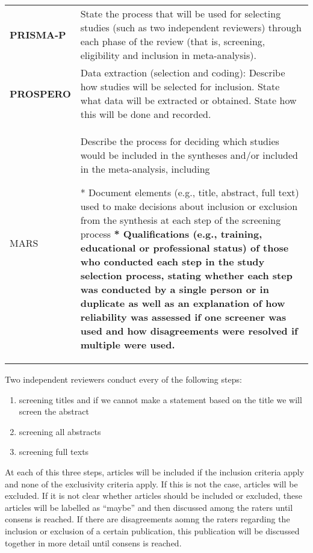 \documentclass[
]{article}
\providecommand{\tightlist}{%
  \setlength{\itemsep}{0pt}\setlength{\parskip}{0pt}}
\begin{document}
\hypertarget{desos}{}
\begin{collapse}

\begin{table}[H]
\centering
\begin{tabular}{>{}l|l}
\hline
\cellcolor[HTML]{ececec}{source} & \cellcolor[HTML]{ececec}{description}\\
\hline
\textbf{PRISMA-P} & State the process that will be used for selecting studies (such as two independent reviewers) through each phase of the review (that is, screening, eligibility and inclusion in meta-analysis).\\
\hline
\textbf{PROSPERO} & Data extraction (selection and coding): Describe how studies will be selected for inclusion. State what data will be extracted or obtained. State how this will be done and recorded.\\
\hline
MARS & Describe the process for deciding which studies would be included in the syntheses and/or included in the meta-analysis, including

* Document elements (e.g., title, abstract, full text) used to make decisions about inclusion or exclusion from the synthesis at each step of the screening process 
\textbf{* Qualifications (e.g., training, educational or professional status) of those who conducted each step in the study selection process, stating whether each step was conducted by a single person or in duplicate as well as an explanation of how reliability was assessed if one screener was used and how disagreements were resolved if multiple were used.}\\
\hline
\end{tabular}
\end{table}

\end{collapse}

Two independent reviewers conduct every of the following steps:

\begin{enumerate}
\def\labelenumi{\arabic{enumi})}
\tightlist
\item
  screening titles and if we cannot make a statement based on the title
  we will screen the abstract
\item
  screening all abstracts
\item
  screening full texts
\end{enumerate}

At each of this three steps, articles will be included if the inclusion
criteria apply and none of the exclusivity criteria apply. If this is
not the case, articles will be excluded. If it is not clear whether
articles should be included or excluded, these articles will be labelled
as ``maybe'' and then discussed among the raters until consens is
reached. If there are disagreements aomng the raters regarding the
inclusion or exclusion of a certain publication, this publication will
be discussed together in more detail until consens is reached.
\end{document}
